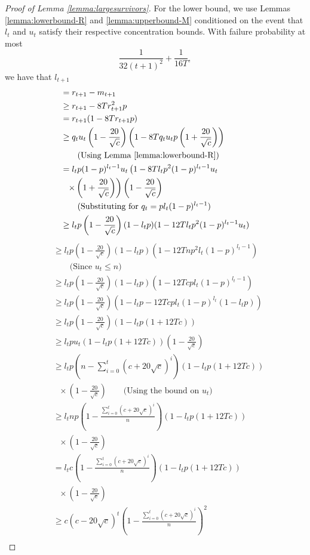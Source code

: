 \documentclass[11pt]{article}
\begin{document}
\begin{proof}[Proof of Lemma \ref{lemma:largesurvivors}]
For the lower bound, we use Lemmas \ref{lemma:lowerbound-R} and \ref{lemma:upperbound-M} conditioned on the event that $l_t$ and $u_t$ satisfy their respective concentration bounds. With failure probability at most
\[
\frac{1}{32(t+1)^2}+\frac{1}{16T},
\]
we have that $l_{t+1}$
\begin{align*}
&=r_{t+1}-m_{t+1}\\
&\geq r_{t+1} - 8Tr_{t+1}^2p\\
&= r_{t+1}(1-8Tr_{t+1}p)\\
&\geq q_tu_t\left(1-\frac{20}{\sqrt{c}}\right)\left(1-8Tq_tu_tp\left(1+\frac{20}{\sqrt{c}}\right)\right)\\
&\quad \quad \text{(Using Lemma \ref{lemma:lowerbound-R})}\\
&= l_tp(1-p)^{l_t-1}u_t\left(1-8Tl_tp^2(1-p)^{l_t-1}u_t\right.\\
&\ \ \left.\times\left(1+\frac{20}{\sqrt{c}}\right)\right)\left(1-\frac{20}{\sqrt{c}}\right)\\
& \quad \quad \text{(Substituting for $q_t=pl_t(1-p)^{l_t-1}$)}\\
& \geq l_tp\left(1-\frac{20}{\sqrt{c}}\right)(1-l_tp)(1-12Tl_tp^2(1-p)^{l_t-1}u_t)\\
\end{align*}
\begin{align*}
&\geq l_tp\left(1-\frac{20}{\sqrt{c}}\right)(1-l_tp)(1-12Tnp^2l_t(1-p)^{l_t-1})\\
& \quad \quad \text{(Since $u_t\leq n$)}\\
&\geq l_tp\left(1-\frac{20}{\sqrt{c}}\right)(1-l_tp)(1-12Tcpl_t(1-p)^{l_t-1})\\
&\geq l_tp\left(1-\frac{20}{\sqrt{c}}\right)(1-l_tp-12Tcpl_t(1-p)^{l_t}(1-l_tp))\\
&\geq l_tp\left(1-\frac{20}{\sqrt{c}}\right)(1-l_tp(1+12Tc))\\
&\geq l_tpu_t(1-l_tp(1+12Tc))\left(1-\frac{20}{\sqrt{c}}\right)\\
&\geq l_tp(n-\sum_{i=0}^t {(c+20\sqrt{c})^i})(1-l_tp(1+12Tc))\\
&\ \ \ \times \left(1-\frac{20}{\sqrt{c}}\right) \quad \quad \text{(Using the bound on $u_t$)}\\
&\geq l_tnp\left(1-\frac{\sum_{i=0}^t {(c+20\sqrt{c})^i}}{n}\right)(1-l_tp(1+12Tc))\\
&\ \ \ \times \left(1-\frac{20}{\sqrt{c}}\right)\\&= l_tc\left(1-\frac{\sum_{i=0}^t {(c+20\sqrt{c})^i}}{n}\right)(1-l_tp(1+12Tc))\\
&\ \ \ \times\left(1-\frac{20}{\sqrt{c}}\right)\\&\geq c(c-20\sqrt{c})^{t}\left(1-\frac{\sum_{i=0}^t {(c+20\sqrt{c})^i}}{n}\right)^2\\

\end{align*}
\end{proof}
\end{document}
